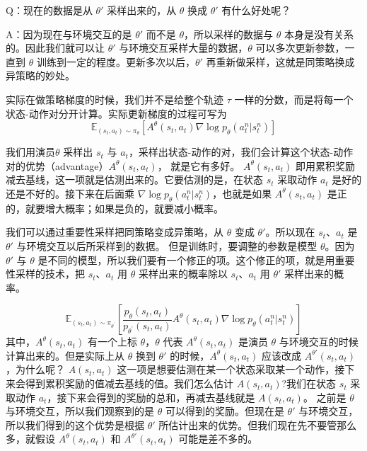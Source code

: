 Q：现在的数据是从 $\theta'$ 采样出来的，从 $\theta$ 换成 $\theta'$ 有什么好处呢？

A：因为现在与环境交互的是 $\theta'$ 而不是 $\theta$，所以采样的数据与 $\theta$ 本身是没有关系的。因此我们就可以让 $\theta'$ 与环境交互采样大量的数据，$\theta$ 可以多次更新参数，一直到 $\theta$ 训练到一定的程度。更新多次以后，$\theta'$ 再重新做采样，这就是同策略换成异策略的妙处。

实际在做策略梯度的时候，我们并不是给整个轨迹 $\tau$ 一样的分数，而是将每一个状态-动作对分开计算。实际更新梯度的过程可写为
\begin{equation}
    \label{eq:}
    \mathbb{E}_{\left(s_{t}, a_{t}\right) \sim \pi_{\theta}}\left[A^{\theta}\left(s_{t}, a_{t}\right) \nabla \log p_{\theta}\left(a_{t}^{n} | s_{t}^{n}\right)\right]
\end{equation}

我们用演员$\theta$  采样出 $s_t$ 与 $a_t$，采样出状态-动作的对，我们会计算这个状态-动作对的优势（advantage）$A^{\theta}\left(s_{t}, a_{t}\right)$， 就是它有多好。
$A^{\theta}\left(s_{t}, a_{t}\right)$ 即用累积奖励减去基线，这一项就是估测出来的。它要估测的是，在状态 $s_t$ 采取动作 $a_t$ 是好的还是不好的。接下来在后面乘 $\nabla \log p_{\theta}\left(a_{t}^{n} | s_{t}^{n}\right)$，也就是如果 $A^{\theta}\left(s_{t}, a_{t}\right)$ 是正的，就要增大概率；如果是负的，就要减小概率。

我们可以通过重要性采样把同策略变成异策略，从 $\theta$ 变成 $\theta'$。所以现在 $s_t$、$a_t$ 是 $\theta'$ 与环境交互以后所采样到的数据。 但是训练时，要调整的参数是模型 $\theta$。因为 $\theta'$  与 $\theta$ 是不同的模型，所以我们要有一个修正的项。这个修正的项，就是用重要性采样的技术，把 $s_t$、$a_t$ 用 $\theta$ 采样出来的概率除以 $s_t$、$a_t$  用 $\theta'$  采样出来的概率。

\begin{equation}
    \label{eq:IS_1}
    \mathbb{E}_{\left(s_{t}, a_{t}\right) \sim \pi_{\theta^{\prime}}}\left[\frac{p_{\theta}\left(s_{t}, a_{t}\right)}{p_{\theta^{\prime}}\left(s_{t}, a_{t}\right)} A^{\theta}\left(s_{t}, a_{t}\right) \nabla \log p_{\theta}\left(a_{t}^{n} | s_{t}^{n}\right)\right]
\end{equation}
其中，$A^{\theta}(s_t,a_t)$ 有一个上标 $\theta$，$\theta$  代表 $A^{\theta}(s_t,a_t)$ 是演员 $\theta$ 与环境交互的时候计算出来的。但是实际上从 $\theta$ 换到 $\theta'$  的时候，$A^{\theta}(s_t,a_t)$ 应该改成 $A^{\theta'}(s_t,a_t)$，为什么呢？
 $A(s_t,a_t)$ 这一项是想要估测在某一个状态采取某一个动作，接下来会得到累积奖励的值减去基线的值。我们怎么估计 $A(s_t,a_t)$?我们在状态 $s_t$ 采取动作 $a_t$，接下来会得到的奖励的总和，再减去基线就是 $A(s_t,a_t)$。
之前是 $\theta$ 与环境交互，所以我们观察到的是 $\theta$ 可以得到的奖励。但现在是 $\theta'$  与环境交互，所以我们得到的这个优势是根据 $\theta'$  所估计出来的优势。但我们现在先不要管那么多，就假设 $A^{\theta}(s_t,a_t)$ 和 $A^{\theta'}(s_t,a_t)$ 可能是差不多的。

